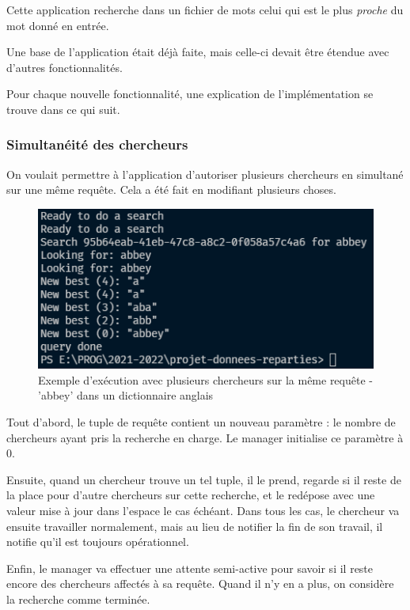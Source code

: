 \documentclass[headings=standardclasses,parskip=half]{scrartcl}
\begin{document}
Cette application recherche dans un fichier de mots celui qui est le plus \textit{proche} du mot donné en entrée.

Une base de l'application était déjà faite, mais celle-ci devait être étendue avec d'autres fonctionnalités.

Pour chaque nouvelle fonctionnalité, une explication de l'implémentation se trouve dans ce qui suit.

\subsubsection{Simultanéité des chercheurs}

On voulait permettre à l'application d'autoriser plusieurs chercheurs en simultané sur une même requête.
Cela a été fait en modifiant plusieurs choses.

\begin{figure}[h]
    \centering
    \includegraphics[scale=0.5]{plusieurs-chercheurs.png}
    \caption{Exemple d'exécution avec plusieurs chercheurs sur la même requête
        - 'abbey' dans un dictionnaire anglais}
\end{figure}

Tout d'abord, le tuple de requête contient un nouveau paramètre : le nombre de chercheurs ayant pris la recherche en charge.
Le manager initialise ce paramètre à 0.

Ensuite, quand un chercheur trouve un tel tuple, il le prend, regarde si il reste de la place pour d'autre chercheurs sur cette recherche,
et le redépose avec une valeur mise à jour dans l'espace le cas échéant.
Dans tous les cas, le chercheur va ensuite travailler normalement, mais au lieu de notifier la fin de son travail, il notifie qu'il
est toujours opérationnel.

Enfin, le manager va effectuer une attente semi-active pour savoir si il reste encore des chercheurs affectés à sa requête.
Quand il n'y en a plus, on considère la recherche comme terminée.
\end{document}
